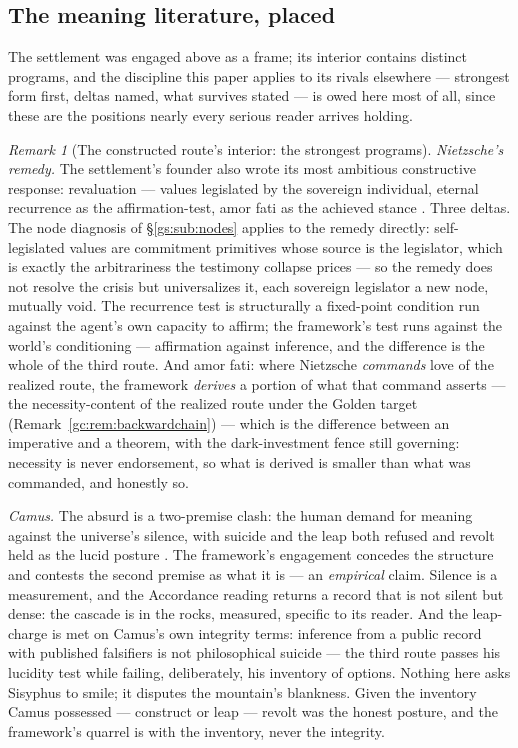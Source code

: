 \documentclass[11pt]{article}
\numberwithin{equation}{section}
\theoremstyle{plain}
\theoremstyle{definition}
\theoremstyle{remark}
\newtheorem{remark}[theorem]{Remark}
\begin{document}
\subsection{The meaning literature, placed}\label{gs:sub:meaningplacement}

The settlement was engaged above as a frame; its interior contains
distinct programs, and the discipline this paper applies to its rivals
elsewhere --- strongest form first, deltas named, what survives stated
--- is owed here most of all, since these are the positions nearly
every serious reader arrives holding.

\begin{remark}[The constructed route's interior: the strongest
programs]\label{gs:rem:constructedwing}
\emph{Nietzsche's remedy.} The settlement's founder also wrote its
most ambitious constructive response: revaluation --- values
legislated by the sovereign individual, eternal recurrence as the
affirmation-test, amor fati as the achieved stance
\cite{nietzsche1974gay}. Three deltas. The node diagnosis of
\S\ref{gs:sub:nodes} applies to the remedy directly: self-legislated
values are commitment primitives whose source is the legislator, which
is exactly the arbitrariness the testimony collapse prices --- so the
remedy does not resolve the crisis but universalizes it, each
sovereign legislator a new node, mutually void. The recurrence test is
structurally a fixed-point condition run against the agent's own
capacity to affirm; the framework's test runs against the world's
conditioning --- affirmation against inference, and the difference is
the whole of the third route. And amor fati: where Nietzsche
\emph{commands} love of the realized route, the framework
\emph{derives} a portion of what that command asserts --- the
necessity-content of the realized route under the Golden target
(Remark~\ref{gc:rem:backwardchain}) --- which is the difference
between an imperative and a theorem, with the dark-investment fence
still governing: necessity is never endorsement, so what is derived
is smaller than what was commanded, and honestly so.

\emph{Camus.} The absurd is a two-premise clash: the human demand for
meaning against the universe's silence, with suicide and the leap both
refused and revolt held as the lucid posture \cite{Camus42}. The
framework's engagement concedes the structure and contests the second
premise as what it is --- an \emph{empirical} claim. Silence is a
measurement, and the Accordance reading returns a record that is not
silent but dense: the cascade is in the rocks, measured, specific to
its reader. And the leap-charge is met on Camus's own integrity
terms: inference from a public record with published falsifiers is
not philosophical suicide --- the third route passes his lucidity
test while failing, deliberately, his inventory of options. Nothing
here asks Sisyphus to smile; it disputes the mountain's blankness.
Given the inventory Camus possessed --- construct or leap --- revolt
was the honest posture, and the framework's quarrel is with the
inventory, never the integrity.


\end{remark}
\end{document}
